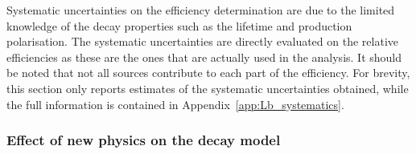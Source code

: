 %
Systematic uncertainties on the efficiency determination are due to the limited knowledge
of the decay properties such as the \Lb lifetime and production polarisation.
The systematic uncertainties are directly evaluated on the relative efficiencies as these are the ones that
are actually used in the analysis. It should be noted that not all sources contribute to each part
of the efficiency. For brevity, this section only reports estimates of the systematic
uncertainties obtained, while the full information is contained in Appendix~\ref{app:Lb_systematics}.
%

\subsubsection{Effect of new physics on the decay model}
\label{sec:WCvariation}

